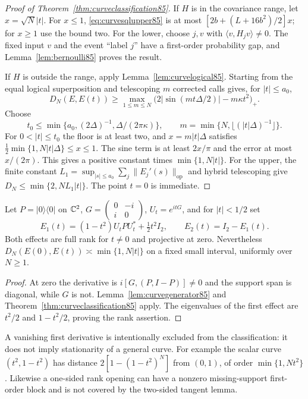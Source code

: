 \begin{proof}[Proof of Theorem~\ref{thm:curveclassification85}]
If $H$ is in the covariance range, let $x=\sqrt N|t|$.
For $x\le1$, \eqref{eq:curvesqlupper85} is at most
$[2b+(L+16b^2)/2]x$; for $x\ge1$ use the bound two.
For the lower, choose $j,v$ with $\langle v,H_jv\rangle\ne0$.
The fixed input $v$ and the event ``label $j$'' have a first-order
probability gap, and Lemma~\ref{lem:bernoulli85} proves the result.

If $H$ is outside the range, apply Lemma~\ref{lem:curvelogical85}.
Starting from the equal logical superposition and telescoping $m$
corrected calls gives, for $|t|\le a_0$,
\begin{equation}\label{eq:curvefinitelower85}
 D_N(E,E(t))\ge
 \max_{1\le m\le N}\bigl(2|\sin(mt\Delta/2)|-m\kappa t^2\bigr)_+.
\end{equation}
Choose
\[
 t_0\le\min\{a_0,(2\Delta)^{-1},\Delta/(2\pi\kappa)\},\qquad
 m=\min\{N,\lfloor(|t|\Delta)^{-1}\rfloor\}.
\]
For $0<|t|\le t_0$ the floor is at least two, and
$x=m|t|\Delta$ satisfies
$\tfrac12\min\{1,N|t|\Delta\}\le x\le1$.
The sine term is at least $2x/\pi$ and the error at most $x/(2\pi)$.
This gives a positive constant times $\min\{1,N|t|\}$.
For the upper, the finite constant
$L_1=\sup_{|s|\le a_0}\sum_j\|E_j'(s)\|_{\mathrm{op}}$
and hybrid telescoping give $D_N\le\min\{2,NL_1|t|\}$.
The point $t=0$ is immediate.
\end{proof}

\begin{corollary}\label{cor:rankopening85}
Let $P=|0\rangle\langle0|$ on $\mathbb C^2$,
$G=\left(\begin{smallmatrix}0&-i\\i&0\end{smallmatrix}\right)$,
$U_t=e^{itG}$, and for $|t|<1/2$ set
\[
 E_1(t)=(1-t^2)U_tPU_t^*+\tfrac12t^2I_2,
 \qquad E_2(t)=I_2-E_1(t).
\]
Both effects are full rank for $t\ne0$ and projective at zero.
Nevertheless $D_N(E(0),E(t))\asymp\min\{1,N|t|\}$ on a fixed
small interval, uniformly over $N\ge1$.
\end{corollary}
\begin{proof}
At zero the derivative is $i[G,(P,I-P)]\ne0$ and the support span
is diagonal, while $G$ is not.  Lemma~\ref{lem:curvegenerator85}
and Theorem~\ref{thm:curveclassification85} apply.  The eigenvalues
of the first effect are $t^2/2$ and $1-t^2/2$, proving the rank assertion.
\end{proof}
A vanishing first derivative is intentionally excluded from the
classification: it does not imply stationarity of a general curve.
For example the scalar curve $(t^2,1-t^2)$ has distance
$2[1-(1-t^2)^N]$ from $(0,1)$, of order $\min\{1,Nt^2\}$.
Likewise a one-sided rank opening can have a nonzero missing-support
first-order block and is not covered by the two-sided tangent lemma.
